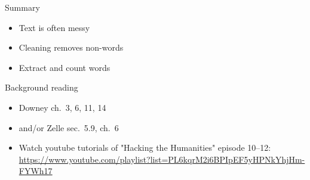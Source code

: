\documentclass[aspectratio=169,usenames,dvipsnames]{beamer}
\begin{document}
\begin{frame}{Summary}
    \begin{itemize}
        \item Text is often messy
        \item Cleaning removes non-words
        \item Extract and count words
    \end{itemize}
\end{frame}





\begin{frame}{Background reading}
    \begin{itemize}
        \item Downey ch.\ 3, 6, 11, 14
        \item and/or Zelle sec.\ 5.9, ch.\ 6
        \item Watch youtube tutorials of "Hacking the Humanities" episode 10--12:
            {\small \url{https://www.youtube.com/playlist?list=PL6kqrM2i6BPIpEF5yHPNkYhjHm-FYWh17}}
    \end{itemize}
\end{frame}
\end{document}
